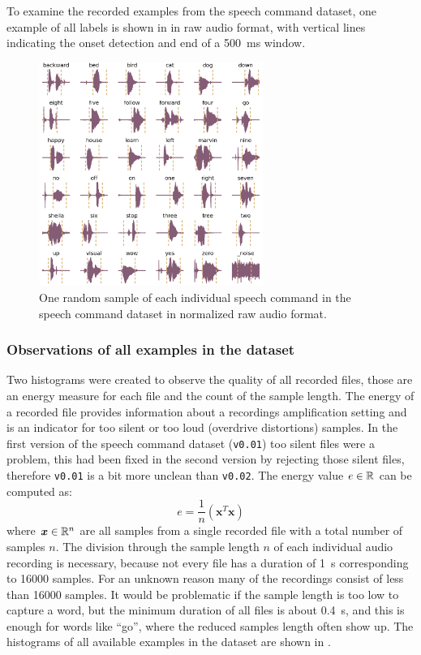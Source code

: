 To examine the recorded examples from the speech command dataset, one example of all labels is shown in  in raw audio format, with vertical lines indicating the onset detection and end of a \SI{500}{\milli\second} window.
\begin{figure}[!ht]
  \centering
    \includegraphics[width=0.65\textwidth]{./5_exp/figs/exp_dataset_speech_cmd_wav_grid}
  \caption{One random sample of each individual speech command in the speech command dataset in normalized raw audio format.}
  \label{fig:exp_dataset_speech_cmd_wav_grid}
\end{figure}
\FloatBarrier
\noindent



\subsubsection{Observations of all examples in the dataset}
Two histograms were created to observe the quality of all recorded files, those are an energy measure for each file and the count of the sample length.
The energy of a recorded file provides information about a recordings amplification setting and is an indicator for too silent or too loud (overdrive distortions) samples. 
In the first version of the speech command dataset (\texttt{v0.01}) too silent files were a problem, this had been fixed in the second version by rejecting those silent files, therefore \texttt{v0.01} is a bit more unclean than \texttt{v0.02}.
The energy value $e \in \mathbb{R}$ can be computed as:
\begin{equation}\label{eq:exp_dataset_energy}
  e = \frac{1}{n} \left( \bm{x}^T \bm{x} \right)
\end{equation}
where $\bm{x} \in \mathbb{R}^n$ are all samples from a single recorded file with a total number of samples $n$.
The division through the sample length $n$ of each individual audio recording is necessary, because not every file has a duration of \SI{1}{\second} corresponding to 16000 samples.
For an unknown reason many of the recordings consist of less than 16000 samples.
It would be problematic if the sample length is too low to capture a word, but the minimum duration of all files is about \SI{0.4}{\second}, and this is enough for words like \enquote{go}, where the reduced samples length often show up.
The histograms of all available examples in the dataset are shown in .

